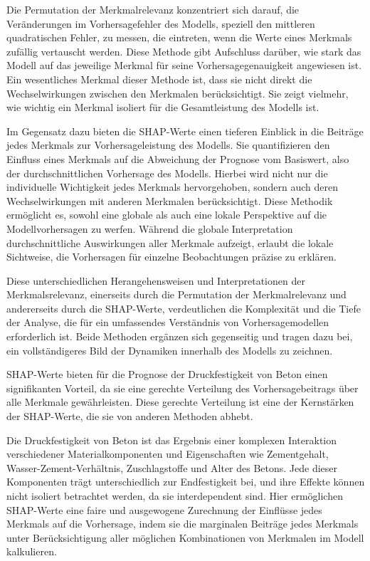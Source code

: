 Die Permutation der Merkmalrelevanz konzentriert sich darauf, die Veränderungen im Vorhersagefehler des Modells, 
speziell den mittleren quadratischen Fehler, zu messen, die eintreten, wenn die Werte eines Merkmals zufällig vertauscht werden. 
Diese Methode gibt Aufschluss darüber, wie stark das Modell auf das jeweilige Merkmal für seine Vorhersagegenauigkeit angewiesen ist. 
Ein wesentliches Merkmal dieser Methode ist, dass sie nicht direkt die Wechselwirkungen zwischen den Merkmalen berücksichtigt. 
Sie zeigt vielmehr, wie wichtig ein Merkmal isoliert für die Gesamtleistung des Modells ist.

Im Gegensatz dazu bieten die SHAP-Werte einen tieferen Einblick in die Beiträge jedes Merkmals zur Vorhersageleistung des Modells. 
Sie quantifizieren den Einfluss eines Merkmals auf die Abweichung der Prognose vom Basiswert, also der durchschnittlichen Vorhersage des Modells. 
Hierbei wird nicht nur die individuelle Wichtigkeit jedes Merkmals hervorgehoben, sondern auch deren Wechselwirkungen mit anderen 
Merkmalen berücksichtigt. Diese Methodik ermöglicht es, sowohl eine globale als auch eine lokale Perspektive auf die Modellvorhersagen zu werfen. 
Während die globale Interpretation durchschnittliche Auswirkungen aller Merkmale aufzeigt, erlaubt die lokale Sichtweise, die Vorhersagen 
für einzelne Beobachtungen präzise zu erklären.

Diese unterschiedlichen Herangehensweisen und Interpretationen der Merkmalsrelevanz, einerseits durch die 
Permutation der Merkmalrelevanz und andererseits durch die SHAP-Werte, verdeutlichen die Komplexität und die Tiefe der Analyse, 
die für ein umfassendes Verständnis von Vorhersagemodellen erforderlich ist. Beide Methoden ergänzen sich gegenseitig und tragen dazu bei, 
ein vollständigeres Bild der Dynamiken innerhalb des Modells zu zeichnen.

SHAP-Werte bieten für die Prognose der Druckfestigkeit von Beton einen signifikanten Vorteil, 
da sie eine gerechte Verteilung des Vorhersagebeitrags über alle Merkmale gewährleisten. 
Diese gerechte Verteilung ist eine der Kernstärken der 
SHAP-Werte, die sie von anderen Methoden abhebt.

Die Druckfestigkeit von Beton ist das Ergebnis einer komplexen Interaktion verschiedener 
Materialkomponenten und Eigenschaften wie Zementgehalt, Wasser-Zement-Verhältnis, 
Zuschlagstoffe und Alter des Betons. Jede dieser Komponenten trägt unterschiedlich 
zur Endfestigkeit bei, und ihre Effekte können nicht isoliert betrachtet werden, 
da sie interdependent sind. Hier ermöglichen SHAP-Werte eine faire und ausgewogene 
Zurechnung der Einflüsse jedes Merkmals auf die Vorhersage, indem sie die marginalen 
Beiträge jedes Merkmals unter Berücksichtigung aller möglichen Kombinationen von Merkmalen 
im Modell kalkulieren.

